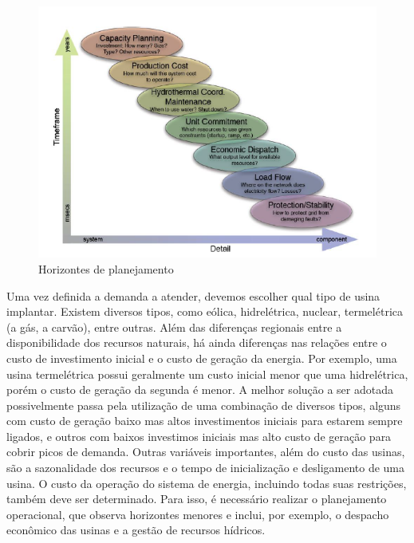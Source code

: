 \begin{figure}[h]
\begin{centering}
\includegraphics[scale=1]{anexos/hor-plan}
\par\end{centering}

\caption{\label{fig:Horizontes-de-planejamento}Horizontes de planejamento}
\end{figure}



Uma vez definida a demanda a atender, devemos escolher qual tipo de
usina implantar. Existem diversos tipos, como eólica, hidrelétrica,
nuclear, termelétrica (a gás, a carvão), entre outras. Além das diferenças
regionais entre a disponibilidade dos recursos naturais, há ainda
diferenças nas relações entre o custo de investimento inicial e o
custo de geração da energia. Por exemplo, uma usina termelétrica possui
geralmente um custo inicial menor que uma hidrelétrica, porém o custo
de geração da segunda é menor. A melhor solução a ser adotada possivelmente
passa pela utilização de uma combinação de diversos tipos, alguns
com custo de geração baixo mas altos investimentos iniciais para estarem
sempre ligados, e outros com baixos investimos iniciais mas alto custo
de geração para cobrir picos de demanda. Outras variáveis importantes,
além do custo das usinas, são a sazonalidade dos recursos e o tempo
de inicialização e desligamento de uma usina. O custo da operação do sistema de energia, incluindo todas suas restrições, também deve ser determinado. Para isso, é necessário realizar
o planejamento operacional, que observa horizontes menores e inclui,
por exemplo, o despacho econômico das usinas e a gestão de recursos
hídricos. 


